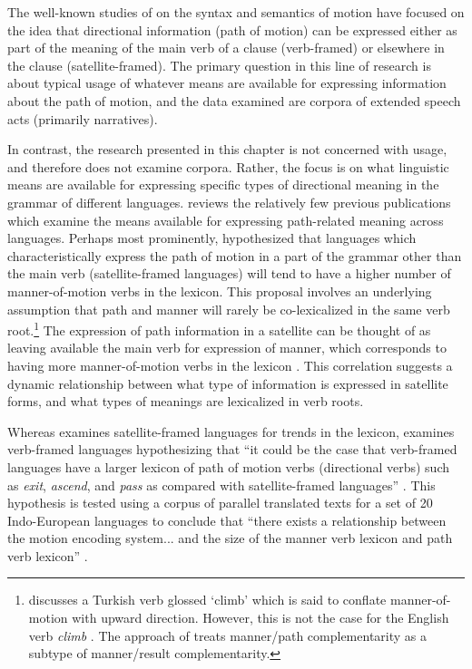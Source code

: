 The well-known studies of \citet{talmyLexicalizationPatternsSemantic1985,talmyCognitiveSemantics2000} on the syntax and semantics of motion have focused on the idea that directional information (path of motion) can be expressed either as part of the meaning of the main verb of a clause (verb-framed) or elsewhere in the clause (satellite-framed). The primary question in this line of research is about typical usage of whatever means are available for expressing information about the path of motion, and the data examined are corpora of extended speech acts (primarily narratives). 

In contrast, the research presented in this chapter is not concerned with usage, and therefore does not examine corpora. Rather, the focus is on what linguistic means are available for expressing specific types of directional meaning in the grammar of different languages. \citet[106--111]{verkerkEvolutionaryDynamicsMotion2014} reviews the relatively few previous publications which examine the means available for expressing path-related meaning across languages. Perhaps most prominently, \citet[458]{slobinMindCodeText1997} hypothesized that languages which characteristically express the path of motion in a part of the grammar other than the main verb (satellite-framed languages) will tend to have a higher number of manner-of-motion verbs in the lexicon. This proposal involves an underlying assumption that path and manner will rarely be co-lexicalized in the same verb root.\footnote{\citet[230]{slobinManyWaysSearch2004} discusses a Turkish verb glossed `climb' which is said to conflate manner-of-motion with upward direction. However, this is not the case for the English verb \textit{climb} \citep{levinLexicalizedMeaningManner2013}. The approach of  \citet{levinLexicalizedMeaningManner2013} treats manner/path complementarity as a subtype of manner/result complementarity.} The expression of path information in a satellite can be thought of as leaving available the main verb for expression of manner, which corresponds to having more manner-of-motion verbs in the lexicon \citep[463]{slobinMindCodeText1997}. This correlation suggests a dynamic relationship between what type of information is expressed in satellite forms, and what types of meanings are lexicalized in verb roots.

Whereas \citet{slobinMindCodeText1997} examines satellite-framed languages for trends in the lexicon, \citet[]{verkerkEvolutionaryDynamicsMotion2014} examines verb-framed languages hypothesizing that ``it could be the case that verb-framed languages have a larger lexicon of path of motion verbs (directional verbs) such as \textit{exit}, \textit{ascend}, and \textit{pass} as compared with satellite-framed languages'' \citep[111]{verkerkEvolutionaryDynamicsMotion2014}. This hypothesis is tested using a corpus of parallel translated texts for a set of 20 Indo-European languages to conclude that ``there exists a relationship between the motion encoding system... and the size of the manner verb lexicon and path verb lexicon'' \citep[137]{verkerkEvolutionaryDynamicsMotion2014}. 

